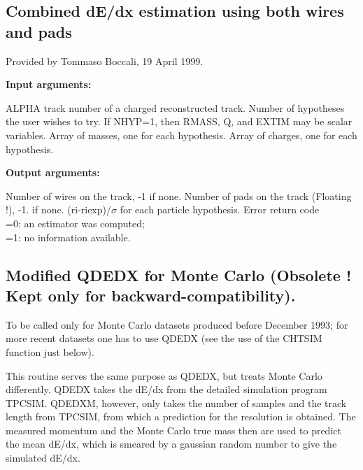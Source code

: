 \subsection{\label{sec-OARDDX}Combined dE/dx estimation using both wires and pads}
\par
{}
\par

Provided by Tommaso Boccali, 19 April 1999.

\par
 
{\bf Input arguments:}
\begin{indentlist}{ 3.50cm}{ 3.75cm}
ALPHA track number of a charged reconstructed track.
Number of hypotheses the user wishes to try.
If NHYP=1, then RMASS, Q, and EXTIM may be scalar variables.
Array of masses, one for each hypothesis.
Array of charges, one for each hypothesis.
\end{indentlist}

{\bf Output arguments:}
\begin{indentlist}{ 3.50cm}{ 3.75cm}
Number of wires on the track, -1 if none.                   
Number of pads on the track (Floating !), -1. if none.
 (ri-riexp)/$\sigma$  for each  particle hypothesis.
Error return code\\
=0: an estimator was computed;\\
 =1: no information available.
\end{indentlist}
\par




\subsection{\label{sec-OARDEDM}Modified QDEDX for Monte Carlo (Obsolete ! Kept only for backward-compatibility).}
\par
{}
\par
To be called only for Monte Carlo datasets produced before December 1993; for more recent datasets one has to use
QDEDX (see the use of the CHTSIM function just below).
\par
This routine serves the same purpose as QDEDX,
but treats Monte Carlo differently.
QDEDX takes the dE/dx from the detailed simulation program TPCSIM.
QDEDXM, however, only takes the number of samples and the track length
from TPCSIM, from which a prediction for the resolution is obtained.
The measured momentum and the Monte Carlo true mass then are used
to predict the mean dE/dx, which is smeared by a gaussian random
number to give the simulated dE/dx.
 
